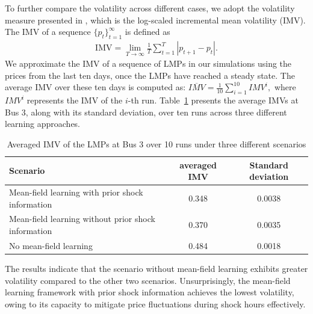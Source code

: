 \documentclass{article}
\theoremstyle{definition}
\theoremstyle{plain}
\begin{document}
To further compare the volatility across different cases, we adopt the volatility measure presented in \cite{roozbehani2012volatility}, which is the log-scaled incremental mean volatility (IMV). The IMV of a sequence $\{p_t\}_{t=1}^{\infty}$ is defined as
\begin{align}
\text{IMV} = \lim_{T\to\infty}\frac{1}{T}\sum_{t=1}^T |p_{t+1} - p_{t}|.
\end{align}
We approximate the IMV of a sequence of LMPs in our simulations using the prices from the last ten days, once the LMPs have reached a steady state. The average IMV over these ten days is computed as:  
$\overline{IMV} = \frac{1}{10} \sum_{i=1}^{10} IMV^i,$
where \( IMV^i \) represents the IMV of the \( i \)-th run. Table~\ref{IMV} presents the average IMVs at Bus 3, along with its standard deviation, over ten runs across three different learning approaches.
\begin{table}[h!]
	\caption{%
		Averaged IMV of the LMPs at Bus 3 over 10 runs under three different scenarios}
	\vspace{0.2cm}
	\centering
	\begin{tabular}{l c c}
		\hline
		\centering \textbf{Scenario} & averaged IMV & Standard deviation\\
		\hline\hline
		\centering Mean-field
		learning with prior shock information & 0.348 &0.0038\\
		Mean-field
		\centering learning without prior shock information & 0.370&0.0035\\
		\centering No mean-field learning & 0.484& 0.0018\\
		
		\hline
	\end{tabular}
	\label{IMV}
\end{table}
The results indicate that the scenario without mean-field learning exhibits greater volatility compared to the other two scenarios. Unsurprisingly, the mean-field learning framework with prior shock information achieves the lowest volatility, owing to its capacity to mitigate price fluctuations during shock hours effectively.
\end{document}
